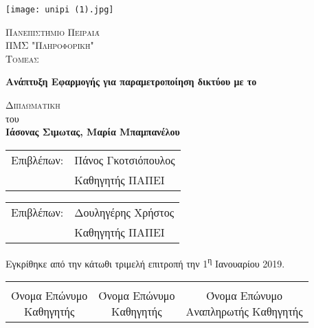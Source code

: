            \begin{center}
	
	       \vspace*{-1cm}

    \texttt{[image: unipi (1).jpg]}
        
    \Large
    \textsc{Πανεπιστήμιο Πειραιά}\\
    \large
    \textsc{ΠΜΣ "Πληροφορική" }\\
    \textsc{Τομεας}
    
    \vspace{1.5cm}
	
	\Huge
    \textbf{Ανάπτυξη Εφαρμογής για παραμετροποίηση δικτύου με το }
        
    \vspace{1.5cm}
    \Large
    \textsc{Διπλωματικη }\\
    του\\

    \LARGE
    \textbf{Ιάσονας Σιμωτας, Μαρία Μπαμπανέλου}
    
    \vfill
    \end{center}
    
    \begin{tabular}{ll}
		Επιβλέπων: & Πάνος Γκοτσιόπουλος \\
		 & Καθηγητής ΠΑΠΕΙ
	\end{tabular}

    \begin{tabular}{ll}
		Επιβλέπων: & Δουληγέρης Χρήστος \\
		 & Καθηγητής ΠΑΠΕΙ
	\end{tabular}
	
	\vspace{1.5cm}
    
    Εγκρίθηκε από την κάτωθι τριμελή επιτροπή την 1\textsuperscript{η} Ιανουαρίου 2019.
    
    \vspace{1.5cm}
	
	\begin{center}
	\noindent\begin{tabular}{ccc}
		\makebox[0.3\textwidth]{\hrulefill} & 
		\makebox[0.3\textwidth]{\hrulefill} & 
		\makebox[0.3\textwidth]{\hrulefill} \\

		\specialcell{Όνομα Επώνυμο \\ Καθηγητής} & 
		\specialcell{Όνομα Επώνυμο \\ Καθηγητής} & 
		\specialcell{Όνομα Επώνυμο \\ Αναπληρωτής Καθηγητής} \\ [8ex]%
	\end{tabular}
	\end{center}